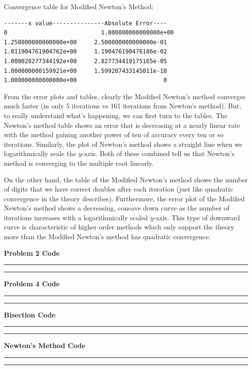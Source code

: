 \documentclass[a4paper,12pt]{article}
\begin{document}
\begin{enumerate}[label = \arabic*.]
\begin{enumerate}[label = \roman*.]
            Convergence table for Modified Newton's Method:
            \begin{verbatim}
-------x value---------------Absolute Error----
0                    	    1.000000000000000e+00
1.250000000000000e+00     2.500000000000000e-01
1.011904761904762e+00     1.190476190476186e-02
1.000028277344192e+00     2.827734419175165e-05
1.000000000159921e+00     1.599207433145011e-10
1.000000000000000e+00                         0
            \end{verbatim}
        
        From the error plots and tables, clearly the Modified Newton's method converges much faster (in only 5 iterations vs 161 iterations from Newton's method). But, to really understand what's happening, we can first turn to the tables. The Newton's method table shows an error that is decreasing at a nearly linear rate with the method gaining another power of ten of accuracy every ten or so iterations. Similarly, the plot of Newton's method shows a straight line when we logarithmically scale the $ y $-axis. Both of these combined tell us that Newton's method is converging to the multiple root linearly. 
        
        On the other hand, the table of the Modified Newton's method shows the number of digits that we have correct doubles after each iteration (just like quadratic convergence in the theory describes). Furthermore, the error plot of the Modified Newton's method shows a decreasing, concave down curve as the number of iterations increases with a logarithmically scaled $ y $-axis. This type of downward curve is characteristic of higher order methods which only support the theory more than the Modified Newton's method has quadratic convergence.
	\end{enumerate}
\end{enumerate}

\newpage
\begin{center}
    \textbf{Problem 2 Code}
\end{center}
\rule{\textwidth}{0.4pt}

\rule{\textwidth}{0.4pt}

\newpage
\begin{center}
    \textbf{Problem 4 Code}
\end{center}
\rule{\textwidth}{0.4pt}

\rule{\textwidth}{0.4pt}

\newpage
\begin{center}
    \textbf{Bisection Code}
\end{center}
\rule{\textwidth}{0.4pt}

\rule{\textwidth}{0.4pt}

\newpage
\begin{center}
    \textbf{Newton's Method Code}
\end{center}
\rule{\textwidth}{0.4pt}

\rule{\textwidth}{0.4pt}
\end{document}
